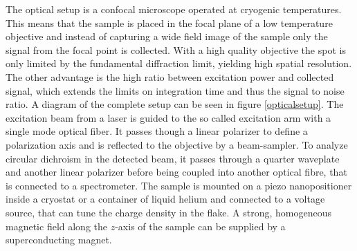 The optical setup is a confocal microscope operated at cryogenic temperatures. This means that the sample is placed in the focal plane of a low temperature objective and instead of capturing a wide field image of the sample only the signal from the focal point is collected. With a high quality objective the spot is only limited by the fundamental diffraction limit, yielding high spatial resolution. The other advantage is the high ratio between excitation power and collected signal, which extends the limits on integration time and thus the signal to noise ratio. A diagram of the complete setup can be seen in figure \ref{opticalsetup}. The excitation beam from a laser is guided to the so called excitation arm with a single mode optical fiber. It passes though a linear polarizer to define a polarization axis and is reflected to the objective by a beam-sampler. To analyze circular dichroism in the detected beam, it passes through a quarter waveplate and another linear polarizer before being coupled into another optical fibre, that is connected to a spectrometer. The sample is mounted on a piezo nanopositioner inside a cryostat or a container of liquid helium and connected to a voltage source, that can tune the charge density in the \tmdg flake. A strong, homogeneous magnetic field along the $z$-axis of the sample can be supplied by a superconducting magnet.

